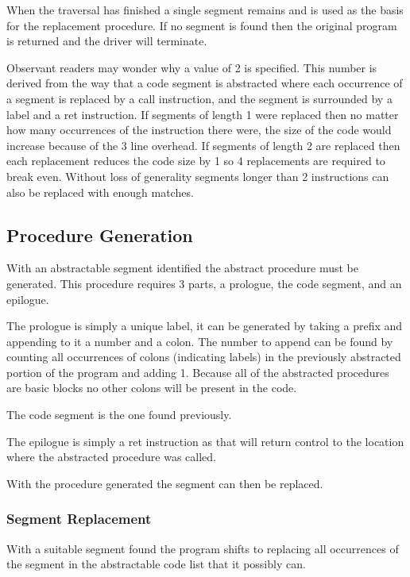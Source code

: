 \documentclass[9pt,nocopyrightspace]{sigplanconf}
\begin{document}
When the traversal has finished a single segment remains and is used as the basis for the replacement procedure.
If no segment is found then the original program is returned and the driver will terminate.

Observant readers may wonder why a value of 2 is specified.
This number is derived from the way that a code segment is abstracted where each occurrence of a segment is replaced by a call instruction, and the segment is surrounded by a label and a ret instruction.
If segments of length 1 were replaced then no matter how many occurrences of the instruction there were, the size of the code would increase because of the 3 line overhead.
If segments of length 2 are replaced then each replacement reduces the code size by 1 so 4 replacements are required to break even.
Without loss of generality segments longer than 2 instructions can also be replaced with enough matches.

\subsection{Procedure Generation}

With an abstractable segment identified the abstract procedure must be generated.
This procedure requires 3 parts, a prologue, the code segment, and an epilogue.

The prologue is simply a unique label, it can be generated by taking a prefix and appending to it a number and a colon.
The number to append can be found by counting all occurrences of colons (indicating labels) in the previously abstracted portion of the program and adding 1.
Because all of the abstracted procedures are basic blocks no other colons will be present in the code.

The code segment is the one found previously.

The epilogue is simply a ret instruction as that will return control to the location where the abstracted procedure was called.

With the procedure generated the segment can then be replaced.

\subsubsection{Segment Replacement}

With a suitable segment found the program shifts to replacing all occurrences of the segment in the abstractable code list that it possibly can.
\end{document}
